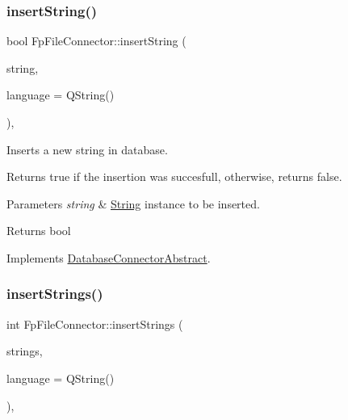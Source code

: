\subsubsection{\texorpdfstring{insert\+String()}{insertString()}}
{\footnotesize\ttfamily bool Fp\+File\+Connector\+::insert\+String (\begin{DoxyParamCaption}\item[{const \mbox{\hyperlink{classString}{String}} \&}]{string,  }\item[{const Q\+String}]{language = {\ttfamily QString()} }\end{DoxyParamCaption})\hspace{0.3cm}{\ttfamily [override]}, {\ttfamily [virtual]}}



Inserts a new string in database. 

Returns true if the insertion was succesfull, otherwise, returns false. 
\begin{DoxyParams}{Parameters}
{\em string} & \mbox{\hyperlink{classString}{String}} instance to be inserted. \\
\hline
\end{DoxyParams}
\begin{DoxyReturn}{Returns}
bool 
\end{DoxyReturn}


Implements \mbox{\hyperlink{classDatabaseConnectorAbstract_ac7cc5cf2deace9652810001722758206}{Database\+Connector\+Abstract}}.

\mbox{\label{classFpFileConnector_a7f31d3e699ce4c489c2303370d032a7e}} 
\subsubsection{\texorpdfstring{insert\+Strings()}{insertStrings()}}
{\footnotesize\ttfamily int Fp\+File\+Connector\+::insert\+Strings (\begin{DoxyParamCaption}\item[{const Q\+List$<$ \mbox{\hyperlink{classString}{String}} $\ast$$>$ \&}]{strings,  }\item[{const Q\+String}]{language = {\ttfamily QString()} }\end{DoxyParamCaption})\hspace{0.3cm}{\ttfamily [override]}, {\ttfamily [virtual]}}



